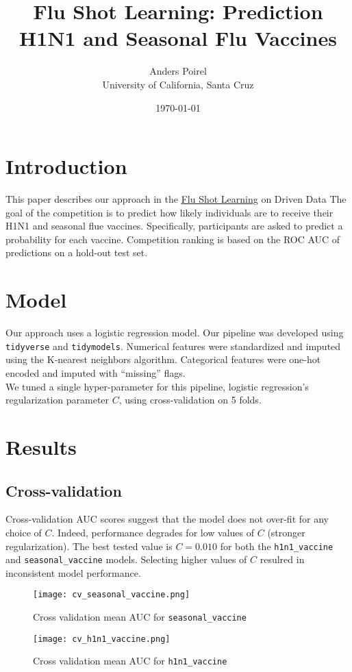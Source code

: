 \documentclass{article}[12pt]
\title{Flu Shot Learning: Prediction H1N1 and Seasonal Flu Vaccines}
\author{Anders Poirel \\ University of California, Santa Cruz}
\date{\today}
\begin{document}
    
\maketitle

\section{Introduction}

This paper describes our approach in 
the \href{https://www.drivendata.org/competitions/66/flu-shot-learning/}{Flu Shot Learning}
on Driven Data \cite{driven-data}
The goal of the competition is to predict how likely individuals are to receive their 
H1N1 and seasonal flue vaccines. Specifically, participants are asked to predict a 
probability for each vaccine. Competition ranking is based on the ROC AUC of predictions 
on a hold-out test set.

\section{Model}

Our approach uses a logistic regression model. Our pipeline was developed using
\texttt{tidyverse}\cite{tidyverse} and \texttt{tidymodels}\cite{tidymodels}. 
Numerical features were standardized and imputed using the K-nearest neighbors
algorithm. Categorical features were one-hot encoded and imputed with ``missing''
flags. \\
We tuned a single hyper-parameter for this pipeline, logistic regression's regularization
parameter $C$, using cross-validation on 5 folds. 

\section{Results}

\subsection{Cross-validation}

Cross-validation AUC scores suggest that the model does not over-fit for any choice
of $C$. Indeed, performance degrades for low values of $C$ (stronger regularization).
The best tested value is $C = 0.010$ for both the \texttt{h1n1\_vaccine} and 
\texttt{seasonal\_vaccine} models. Selecting higher values of $C$ resulred in inconsistent 
model performance. 

\begin{center}
    
\begin{figure}
\texttt{[image: cv\_seasonal\_vaccine.png]}
\caption{Cross validation mean AUC for \texttt{seasonal\_vaccine}}
\end{figure}

\begin{figure}
\texttt{[image: cv\_h1n1\_vaccine.png]}
\caption{Cross validation mean AUC for \texttt{h1n1\_vaccine}}
\end{figure}

\end{center}
\end{document}

